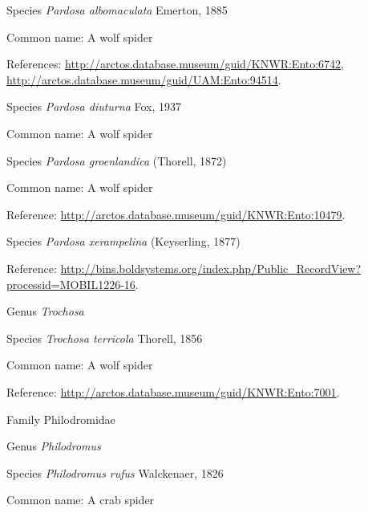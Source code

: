 \documentclass[9pt, article]{memoir}
\begin{document}
\begin{multicols}{2}
\vspace{6pt}\noindent\hspace{36pt}Species \textit{Pardosa albomaculata} Emerton, 1885


Common name: A wolf spider

References: 
\url{http://arctos.database.museum/guid/KNWR:Ento:6742}, 
\url{http://arctos.database.museum/guid/UAM:Ento:94514}.

\vspace{6pt}\noindent\hspace{36pt}Species \textit{Pardosa diuturna} Fox, 1937


Common name: A wolf spider

\vspace{6pt}\noindent\hspace{36pt}Species \textit{Pardosa groenlandica} (Thorell, 1872)


Common name: A wolf spider

Reference: 
\url{http://arctos.database.museum/guid/KNWR:Ento:10479}.

\vspace{6pt}\noindent\hspace{36pt}Species \textit{Pardosa xerampelina} (Keyserling, 1877)


Reference: 
\url{http://bins.boldsystems.org/index.php/Public_RecordView?processid=MOBIL1226-16}.

\vspace{6pt}\noindent\hspace{30pt}Genus \textit{Trochosa}


\vspace{6pt}\noindent\hspace{36pt}Species \textit{Trochosa terricola} Thorell, 1856


Common name: A wolf spider

Reference: 
\url{http://arctos.database.museum/guid/KNWR:Ento:7001}.

\vspace{6pt}\noindent\hspace{24pt}Family Philodromidae


\vspace{6pt}\noindent\hspace{30pt}Genus \textit{Philodromus}


\vspace{6pt}\noindent\hspace{36pt}Species \textit{Philodromus rufus} Walckenaer, 1826


Common name: A crab spider


\end{multicols}
\end{document}
